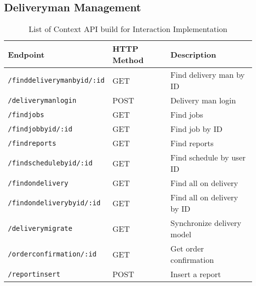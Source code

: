 \subsection*{Deliveryman Management}
\begin{table}[ht]
    \centering
\begin{tabular}{|l|l|p{8cm}|}
\hline
\textbf{Endpoint} & \textbf{HTTP Method} & \textbf{Description} \\ \hline
\texttt{/finddeliverymanbyid/:id} & GET & Find delivery man by ID \\ \hline
\texttt{/deliverymanlogin} & POST & Delivery man login \\ \hline
\texttt{/findjobs} & GET & Find jobs \\ \hline
\texttt{/findjobbyid/:id} & GET & Find job by ID \\ \hline
\texttt{/findreports} & GET & Find reports \\ \hline
\texttt{/findschedulebyid/:id} & GET & Find schedule by user ID \\ \hline
\texttt{/findondelivery} & GET & Find all on delivery \\ \hline
\texttt{/findondeliverybyid/:id} & GET & Find all on delivery by ID \\ \hline
\texttt{/deliverymigrate} & GET & Synchronize delivery model \\ \hline
\texttt{/orderconfirmation/:id} & GET & Get order confirmation \\ \hline
\texttt{/reportinsert} & POST & Insert a report \\ \hline
\end{tabular}
    
    \caption{List of Context API build for Interaction Implementation}
    \label{tab:6.1}
\end{table}


